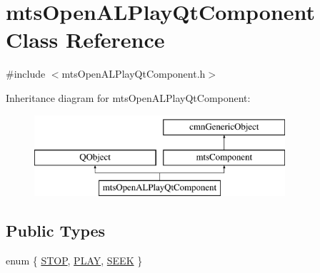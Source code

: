 \hypertarget{classmts_open_a_l_play_qt_component}{\section{mts\-Open\-A\-L\-Play\-Qt\-Component Class Reference}
\label{classmts_open_a_l_play_qt_component}
}


{\ttfamily \#include $<$mts\-Open\-A\-L\-Play\-Qt\-Component.\-h$>$}

Inheritance diagram for mts\-Open\-A\-L\-Play\-Qt\-Component\-:\begin{figure}[H]
\begin{center}
\leavevmode
\includegraphics[height=3.000000cm]{d0/d37/classmts_open_a_l_play_qt_component}
\end{center}
\end{figure}
\subsection*{Public Types}
\begin{DoxyCompactItemize}
\item 
enum \{ \hyperlink{classmts_open_a_l_play_qt_component_a970b410320e64fce64febea1d77acccea4f8405fd97075c94a709704540a2a040}{S\-T\-O\-P}, 
\hyperlink{classmts_open_a_l_play_qt_component_a970b410320e64fce64febea1d77acccea54bb34d81134957005002104220ee8f3}{P\-L\-A\-Y}, 
\hyperlink{classmts_open_a_l_play_qt_component_a970b410320e64fce64febea1d77accceaca7c13ac68f726a977dc35ebd023363e}{S\-E\-E\-K}
 \}
\end{DoxyCompactItemize}
